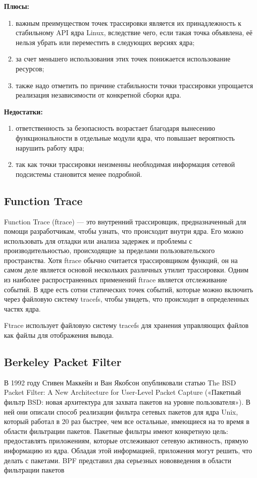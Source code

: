 \textbf{Плюсы:}
\begin{enumerate}
	\item важным преимуществом точек трассировки является их принадлежность к стабильному API ядра Linux, вследствие чего, если такая точка объявлена, её нельзя убрать или переместить в следующих версиях ядра;
	\item за счет меньшего использования этих точек понижается использование ресурсов;
	\item также надо отметить по причине стабильности точки трассировки упрощается реализация независимости от конкретной сборки ядра. 
\end{enumerate}

\textbf{Недостатки:}
\begin{enumerate}
	\item ответственность за безопасность возрастает благодаря вынесению функциональности в отдельные модули ядра, что повышает вероятность нарушить работу ядра;
	\item так как точки трассировки неизменны необходимая информация сетевой подсистемы становится менее подробной.
\end{enumerate}

\subsection{Function Trace}

Function Trace (ftrace) --- это внутренний трассировщик, предназначенный для помощи разработчикам, чтобы узнать, что происходит внутри ядра.
Его можно использовать для отладки или анализа задержек и проблемы с производительностью, происходящие за пределами пользовательского пространства.
Хотя ftrace обычно считается трассировщиком функций, он на самом деле является основой нескольких различных утилит трассировки.
Одним из наиболее распространенных применений ftrace является отслеживание событий.
В ядре есть сотни статических точек событий, которые можно включить через файловую систему tracefs, чтобы увидеть, что происходит в определенных частях ядра.

Ftrace использует файловую систему tracefs для хранения управляющих файлов как файлы для отображения вывода.

\subsection{Berkeley Packet Filter}
В 1992 году Стивен Маккейн и Ван Якобсон опубликовали статью The BSD Packet Filter: A New Architecture for User-Level Packet Capture («Пакетный фильтр BSD: новая архитектура для захвата пакетов на уровне пользователя»).
В ней они описали способ реализации фильтра сетевых пакетов для ядра Unix, который работал в 20 раз быстрее, чем все остальные, имеющиеся
на то время в области фильтрации пакетов.
Пакетные фильтры имеют конкретную цель: предоставлять приложениям, которые отслеживают сетевую активность, прямую информацию из ядра. Обладая этой информацией, приложения могут решить, что делать с пакетами.
BPF представил два серьезных нововведения в области фильтрации пакетов

